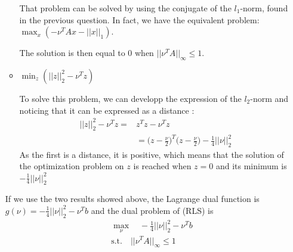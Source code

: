 \documentclass{article}
\begin{document}
\begin{itemize}
\begin{itemize}
            That problem can be solved by using the conjugate of the $l_1$-norm, found in the previous question. In fact, we have the equivalent problem: $\max_x(-\nu^TAx-||x||_1)$.

            The solution is then equal to 0 when $||\nu^TA||_\infty\leq1$.
            \item $\min_z(||z||_2^2-\nu^Tz)$

            To solve this problem, we can developp the expression of the $l_2$-norm and noticing that it can be expressed as a distance :
            \begin{equation}
                \begin{align}
                    ||z||_2^2-\nu^Tz = &z^Tz-\nu^Tz\\
                    &=\bigg(z-\frac{\nu}{2}\bigg)^T\bigg(z-\frac{\nu}{2}\bigg)-\frac{1}{4}||\nu||_2^2
                \end{align}    
            \end{equation}
            As the first is a distance, it is positive, which means that the solution of the optimization problem on $z$ is reached when $z=0$ and its minimum is $-\frac{1}{4}||\nu||_2^2$
        \end{itemize}
        If we use the two results showed above, the Lagrange dual function is $g(\nu)=-\frac{1}{4}||\nu||_2^2-\nu^Tb$ and the dual problem of (RLS) is 
        \begin{equation}
            \begin{aligned}
                &\max_\nu \quad -\frac{1}{4}||\nu||_2^2-\nu^Tb\\
                &\text{s.t.} \quad ||\nu^TA||_\infty\leq1
            \end{aligned}
        \end{equation}
    \end{itemize}
\end{document}
